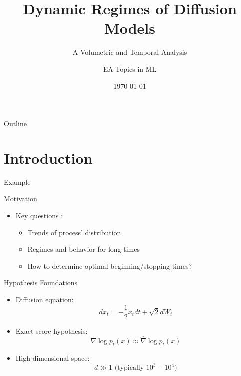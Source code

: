 \documentclass[aspectratio=169]{beamer}
\title{Dynamic Regimes of Diffusion Models}
\subtitle{A Volumetric and Temporal Analysis}
\author{EA Topics in ML}
\institute{Ecole Polytechnique}
\date{\today}
\begin{document}
\begin{frame}
    \titlepage
\end{frame}

\begin{frame}{Outline}
    \tableofcontents
\end{frame}



\section{Introduction}


\begin{frame}{Example}
    \begin{center}
    \end{center}
\end{frame}


\begin{frame}{Motivation}
    \begin{itemize}
        \item Key questions :
        \begin{itemize}
            \item Trends of process' distribution
            \item Regimes and behavior for long times
            \item How to determine optimal beginning/stopping times?
        \end{itemize}
    \end{itemize}
\end{frame}


\begin{frame}{Hypothesis Foundations}
    \begin{itemize}
        \item Diffusion equation:
        \begin{equation}
            dx_t = -\frac{1}{2} x_t dt + \sqrt{2} dW_t
        \end{equation}
        
        \item Exact score hypothesis:
        \begin{equation}
            \nabla \log p_t(x) \approx \hat{\nabla} \log p_t(x)
        \end{equation}
        
        \item High dimensional space:
        \begin{equation}
            d \gg 1 \text{ (typically } 10^3-10^4\text{)}
        \end{equation}
    \end{itemize}
\end{frame}
\end{document}

